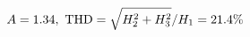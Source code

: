 \documentclass[preview]{standalone}
\begin{document}
\begin{align*}
\special{dvisvgm:raw <g id='unique000'>}A=1.34,\ \text{THD}=\sqrt{H_2^2+H_3^2}/H_1=21.4\%\special{dvisvgm:raw </g>}
\end{align*}
\end{document}
